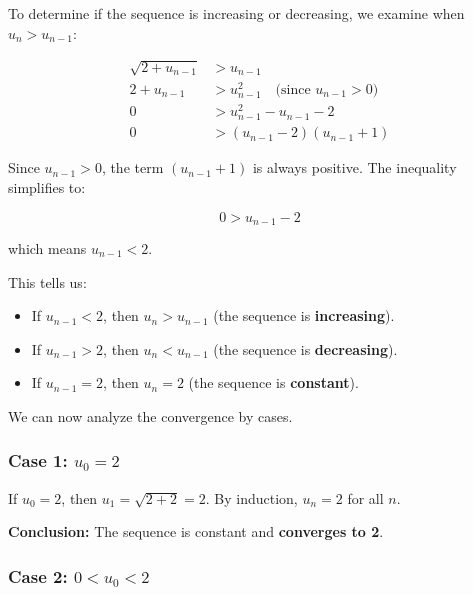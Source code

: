 \documentclass[12pt,a4paper]{article}
\theoremstyle{definition}
\begin{document}
To determine if the sequence is increasing or decreasing, we examine when $u_n > u_{n-1}$:

\begin{align*}
\sqrt{2 + u_{n-1}} &> u_{n-1}\\
2 + u_{n-1} &> u_{n-1}^2 \quad \text{(since } u_{n-1} > 0\text{)}\\
0 &> u_{n-1}^2 - u_{n-1} - 2\\
0 &> (u_{n-1} - 2)(u_{n-1} + 1)
\end{align*}

Since $u_{n-1} > 0$, the term $(u_{n-1} + 1)$ is always positive. The inequality simplifies to:

\[
0 > u_{n-1} - 2
\]

which means $u_{n-1} < 2$.

This tells us:
\begin{itemize}
    \item If $u_{n-1} < 2$, then $u_n > u_{n-1}$ (the sequence is \textbf{increasing}).
    \item If $u_{n-1} > 2$, then $u_n < u_{n-1}$ (the sequence is \textbf{decreasing}).
    \item If $u_{n-1} = 2$, then $u_n = 2$ (the sequence is \textbf{constant}).
\end{itemize}

We can now analyze the convergence by cases.

\subsubsection{Case 1: $u_0 = 2$}

If $u_0 = 2$, then $u_1 = \sqrt{2 + 2} = 2$. By induction, $u_n = 2$ for all $n$.

\textbf{Conclusion:} The sequence is constant and \textbf{converges to 2}.

\subsubsection{Case 2: $0 < u_0 < 2$}
\end{document}
